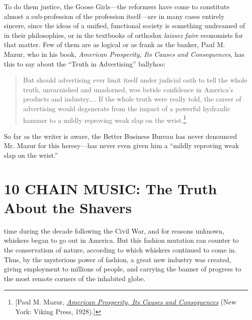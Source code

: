 \documentclass[openany,nobib]{tufte-book}
\let\oldchapter\chapter
\def\chapter{%
  \setcounter{footnote}{0}%
  \oldchapter
}
\begin{document}
To do them justice, the Goose Girls---the reformers have come to
constitute almost a sub-profession of the profession itself---are in
many cases entirely sincere, since the ideas of a unified, functional
society is something undreamed of in their philosophies, or in the
textbooks of orthodox \emph{laissez faire} economists for that matter.
Few of them are as logical or as frank as the banker, Paul M. Mazur, who
in his book, \emph{American Prosperity, Its Causes and Consequences},
has this to say about the ``Truth in Advertising'' ballyhoo:

\begin{quote}
But should advertising ever limit itself under judicial oath to tell the
whole truth, unvarnished and unadorned, woe betide confidence in
America's products and industry.... If the whole truth were really told,
the career of advertising would degenerate from the impact of a powerful
hydraulic hammer to a mildly reproving weak slap on the wrist.\footnote{{[}Paul M. Mazur,
  \emph{\href{https://www.worldcat.org/title/american-prosperity-its-causes-and-consequences/oclc/289643}{American
  Prosperity, Its Causes and Consequences}} (New York: Viking Press,
  1928).{]}}
\end{quote}

So far as the writer is aware, the Better Business Bureau has never
denounced Mr. Mazur for this heresy---has never even given him a
``mildly reproving weak slap on the wrist.''


\chapter[10 \hspace*{1mm} CHAIN MUSIC: The Truth About the Shavers]{10 CHAIN MUSIC: The Truth About the Shavers}

 time during the decade following the Civil War, and for reasons
unknown, whiskers began to go out in America. But this fashion mutation
ran counter to the conservatism of nature, according to which whiskers
continued to come in. Thus, by the mysterious power of fashion, a great
new industry was created, giving employment to millions of people, and
carrying the banner of progress to the most remote corners of the
inhabited globe.
\end{document}

